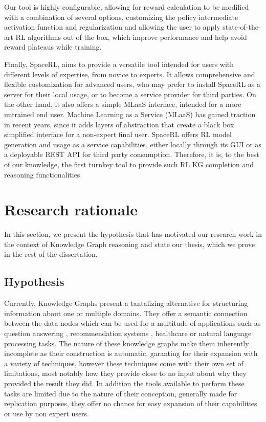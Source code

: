 Our tool is highly configurable, allowing for reward calculation to be modified with a combination of several options, customizing the policy intermediate activation function and regularization and allowing the user to apply state-of-the-art RL algorithms out of the box, which improve performance and help avoid reward plateaus while training.

Finally, SpaceRL, aims to provide a versatile tool intended for users with different levels of expertise, from novice to experts. It allows comprehensive and flexible customization for advanced users, who may prefer to install SpaceRL as a server for their local usage, or to become a service provider for third parties. On the other hand, it also offers a simple MLaaS interface, intended for a more untrained end user. Machine Learning as a Service (MLaaS) has gained traction in recent years, since it adds layers of abstraction that create a black box simplified interface for a non-expert final user. SpaceRL offers RL model generation and usage as a service capabilities, either locally through its GUI or as a deployable REST API for third party consumption. Therefore, it is, to the best of our knowledge, the first turnkey tool to provide such RL KG completion and reasoning functionalities.

\section{Research rationale}\label{sec:intro-rationale}
In this section, we present the hypothesis that has motivated our research work in the context of Knowledge Graph reasoning and state our thesis, which we prove in the rest of the dissertation.

\subsection{Hypothesis}
Currently, Knowledge Graphs present a tantalizing alternative for structuring information about one or multiple domains. They offer a semantic connection between the data nodes which can be used for a multitude of applications such as question answering \cite{}, recommendation systems \cite{}, healthcare \cite{} or natural language processing tasks. The nature of these knowledge graphs make them inherently incomplete as their construction is automatic, garanting for their expansion with a variety of techniques, however these techniques \cite{} come with their own set of limitations, most notably how they provide close to no input about why they provided the result they did. In addition the tools available to perform these tasks are limited due to the nature of their conception, generally made for replication purposes, they offer no chance for easy expansion of their capabilities or use by non expert users.


